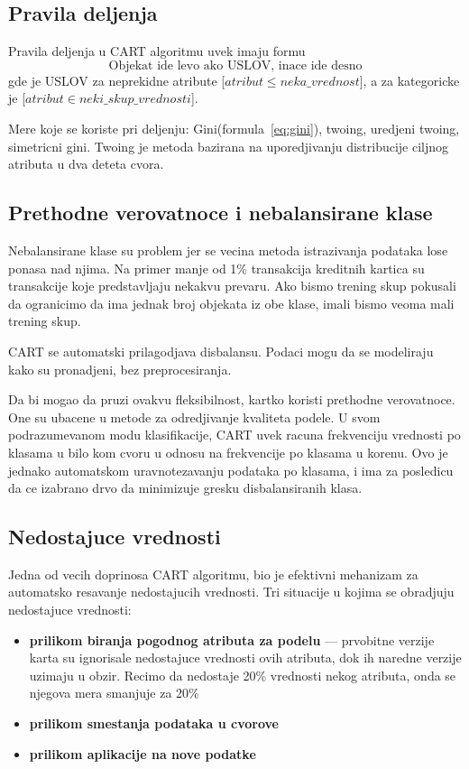 \documentclass[a4paper]{article}
\begin{document}
\subsection{Pravila deljenja}
Pravila deljenja u CART algoritmu uvek imaju formu
\[
    \text{Objekat ide levo ako USLOV, inace ide desno}
\]
gde je USLOV za neprekidne atribute [\(atribut \leq neka\_vrednost\)], a za kategoricke je
[\(atribut \in neki\_skup\_vrednosti\)].

Mere koje se koriste pri deljenju: Gini(formula~\ref{eq:gini}), twoing, uredjeni twoing, simetricni
gini. Twoing je metoda bazirana na uporedjivanju distribucije ciljnog atributa u dva deteta cvora.

\subsection{Prethodne verovatnoce i nebalansirane klase}
Nebalansirane klase su problem jer se vecina metoda istrazivanja podataka lose ponasa nad njima. Na
primer manje od 1\% transakcija kreditnih kartica su transakcije koje predstavljaju nekakvu prevaru.
Ako bismo trening skup pokusali da ogranicimo da ima jednak broj objekata iz obe klase, imali bismo
veoma mali trening skup.

CART se automatski prilagodjava disbalansu. Podaci mogu da se modeliraju kako su pronadjeni, bez
preprocesiranja.

Da bi mogao da pruzi ovakvu fleksibilnost, kartko koristi prethodne verovatnoce. One su ubacene u
metode za odredjivanje kvaliteta podele. U svom podrazumevanom modu klasifikacije, CART uvek racuna
frekvenciju vrednosti po klasama u bilo kom cvoru u odnosu na frekvencije po klasama u korenu. Ovo
je jednako automatskom uravnotezavanju podataka po klasama, i ima za posledicu da ce izabrano drvo
da minimizuje gresku disbalansiranih klasa.

\subsection{Nedostajuce vrednosti}
Jedna od vecih doprinosa CART algoritmu, bio je efektivni mehanizam za automatsko resavanje
nedostajucih vrednosti. Tri situacije u kojima se obradjuju nedostajuce vrednosti:
\begin{itemize}
    \item \textbf{prilikom biranja pogodnog atributa za podelu} --- prvobitne verzije karta su
        ignorisale nedostajuce vrednosti ovih atributa, dok ih naredne verzije uzimaju u obzir.
        Recimo da nedostaje 20\% vrednosti nekog atributa, onda se njegova mera smanjuje za 20\%
    \item \textbf{prilikom smestanja podataka u cvorove}
    \item \textbf{prilikom aplikacije na nove podatke}
\end{itemize}
\end{document}
